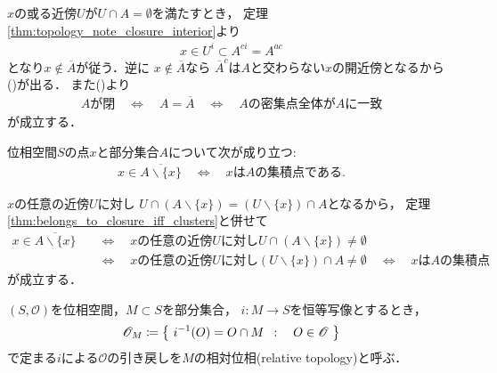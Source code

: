	\begin{prf}
		$x$の或る近傍$U$が$U \cap A = \emptyset$を満たすとき，
		定理\ref{thm:topology_note_closure_interior}より
		\begin{align}
			x \in U^i \subset A^{ci} = A^{ac}
		\end{align}
		となり$x \notin \overline{A}$が従う．逆に
		$x \notin \overline{A}$なら
		$\overline{A}^c$は$A$と交わらない$x$の開近傍となるから
		()が出る．
		また()より
		\begin{align}
			\mbox{$A$が閉} \quad \Longleftrightarrow \quad A = \overline{A}
			\quad \Longleftrightarrow \quad
			\mbox{$A$の密集点全体が$A$に一致}
		\end{align}
		が成立する．
		\QED
	\end{prf}
	
	\begin{screen}
		\begin{thm}
			位相空間$S$の点$x$と部分集合$A$について次が成り立つ:
			\begin{align}
				x \in \overline{A \backslash \{x\}} \quad \Longleftrightarrow \quad
				\mbox{$x$は$A$の集積点である}.
			\end{align}
		\end{thm}
	\end{screen}
	
	\begin{prf}
		$x$の任意の近傍$U$に対し
		$U \cap (A \backslash \{x\}) = (U \backslash \{x\}) \cap A$となるから，
		定理\ref{thm:belongs_to_closure_iff_clusters}と併せて
		\begin{align}
			x \in \overline{A \backslash \{x\}} 
			&\quad \Longleftrightarrow \quad
			\mbox{$x$の任意の近傍$U$に対し$U \cap (A \backslash \{x\}) \neq \emptyset$} \\
			&\quad \Longleftrightarrow \quad
			\mbox{$x$の任意の近傍$U$に対し$(U \backslash \{x\}) \cap A \neq \emptyset$}
			\quad \Longleftrightarrow \quad
			\mbox{$x$は$A$の集積点}
		\end{align}
		が成立する．
		\QED
	\end{prf}
	
	\begin{screen}
		\begin{dfn}[相対位相]
			$(S,\mathscr{O})$を位相空間，$M \subset S$を部分集合，
			$i:M \longrightarrow S$を恒等写像とするとき，
			\begin{align}
				\mathscr{O}_M \coloneqq 
				\left\{\ i^{-1}(O) = O \cap M\ \, : \quad O \in \mathscr{O}\ \right\}
			\end{align}
			で定まる$i$による$\mathscr{O}$の引き戻しを$M$の相対位相(relative topology)と呼ぶ．
		\end{dfn}
	\end{screen}
	
